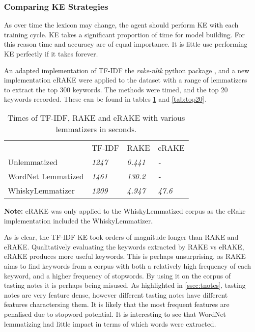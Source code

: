 \subsubsection{Comparing KE Strategies}\label{sssec:kwecomp}
As over time the lexicon may change, the agent should perform KE with each training 
cycle. KE takes a significant proportion of time for model building. For this reason time and accuracy are of equal
importance.  It is little use performing KE perfectly if it takes forever.

An adapted implementation of TF-IDF \cite{tf_idf_imp} the \emph{rake-nltk} python package \cite{sharmer_2018}, and a
new implementation eRAKE were applied to the dataset with a range of lemmatizers to extract the top 300 keywords.
The methods were timed, and the top 20 keywords recorded. 
These can be found in tables \ref{tab:times} and \ref{tab:top20}.

\begin{table}
    \centering
    \begin{threeparttable}

        \caption{Times of TF-IDF, RAKE and eRAKE with various lemmatizers in seconds.}\label{tab:times}
        \begin{tabular}{llll} 
        \toprule
                           & TF-IDF        & RAKE           & eRAKE           \\
        Unlemmatized       & \textit{1247} & \textit{0.441} & \textit{-}      \\
        WordNet Lemmatized & \textit{1461} & \textit{130.2} & \textit{-}      \\
        WhiskyLemmatizer   & \textit{1209} & \textit{4.947} & \textit{47.6}  \\
        \bottomrule
        \end{tabular}
        \begin{tablenotes}
            \small
            \item \textbf{Note:} eRAKE was only applied to the WhiskyLemmatized corpus
            as the eRake implementation included the WhiskyLemmatizer.
        \end{tablenotes}
    \end{threeparttable}
\end{table}

As is clear, the TF-IDF KE took orders of magnitude longer than RAKE and eRAKE.  
Qualitatively evaluating the keywords extracted by RAKE vs eRAKE, eRAKE produces more useful keywords.
This is perhaps unsurprising, as RAKE aims to find keywords from a corpus with both a relatively high frequency
of each keyword, and a higher frequency of stopwords.  By using it on the corpus of tasting notes it is perhaps 
being misused. As highlighted in \autoref{ssec:tnotes}, tasting notes are very feature dense, however different
tasting notes have different features charactersing them.  It is likely that the most frequent features are
penalised due to stopword potential. It is interesting to see that WordNet lemmatizing had little impact 
in terms of which words were extracted.

